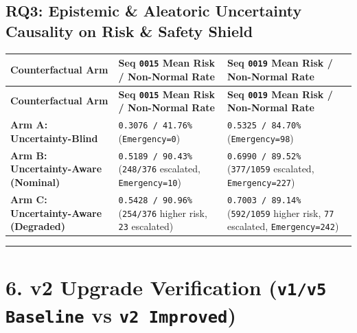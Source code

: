 \documentclass[10.5pt,a4paper]{article}
\begin{document}
\subsection{RQ3: Epistemic \& Aleatoric Uncertainty Causality on Risk \& Safety Shield}

\begin{footnotesize}
\setlength{\tabcolsep}{4pt}
\setlength{\LTleft}{0pt}\setlength{\LTright}{0pt}
\begin{longtable}{>{\raggedright\arraybackslash}p{} >{\raggedright\arraybackslash}p{} >{\raggedright\arraybackslash}p{}}
\toprule
\textbf{Counterfactual Arm} & \textbf{Seq \texttt{0015} Mean Risk / Non-Normal Rate} & \textbf{Seq \texttt{0019} Mean Risk / Non-Normal Rate} \\
\midrule
\endfirsthead
\toprule
\textbf{Counterfactual Arm} & \textbf{Seq \texttt{0015} Mean Risk / Non-Normal Rate} & \textbf{Seq \texttt{0019} Mean Risk / Non-Normal Rate} \\
\midrule
\endhead
\bottomrule
\endfoot
\textbf{Arm A: Uncertainty-Blind} & \texttt{0.\allowbreak{}3076 /\allowbreak{} 41.\allowbreak{}76\%} (\texttt{Emergency=0}) & \texttt{0.\allowbreak{}5325 /\allowbreak{} 84.\allowbreak{}70\%} (\texttt{Emergency=98}) \\
\textbf{Arm B: Uncertainty-Aware (Nominal)} & \texttt{0.\allowbreak{}5189 /\allowbreak{} 90.\allowbreak{}43\%} (\texttt{248/\allowbreak{}376} escalated, \texttt{Emergency=10}) & \texttt{0.\allowbreak{}6990 /\allowbreak{} 89.\allowbreak{}52\%} (\texttt{377/\allowbreak{}1059} escalated, \texttt{Emergency=227}) \\
\textbf{Arm C: Uncertainty-Aware (Degraded)} & \texttt{0.\allowbreak{}5428 /\allowbreak{} 90.\allowbreak{}96\%} (\texttt{254/\allowbreak{}376} higher risk, \texttt{23} escalated) & \texttt{0.\allowbreak{}7003 /\allowbreak{} 89.\allowbreak{}14\%} (\texttt{592/\allowbreak{}1059} higher risk, \texttt{77} escalated, \texttt{Emergency=242}) \\
\end{longtable}
\end{footnotesize}


\par\noindent\rule{\textwidth}{0.4pt}\par\medskip

\section{6. v2 Upgrade Verification (\texttt{v1/\allowbreak{}v5 Baseline} vs \texttt{v2 Improved})}
\end{document}
